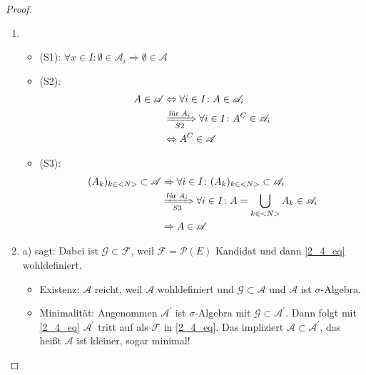 \begin{proof}
	\begin{enumerate}[label=(\alph*)]
		\item 
		\begin{itemize}
			\item (S1): $\forall x \in I\colon \emptyset \in \mathscr{A}_i \Rightarrow \emptyset \in \mathscr{A}$
			\item (S2): 
			\begin{align}
				A \in \mathscr{A} &\Leftrightarrow \forall i \in I \colon A \in \mathscr{A}_i\notag \\
				&\xRightarrow[S2]{\text{für }A_i} \forall i \in I \colon A^C \in \mathscr{A}_i \notag \\
				&\Leftrightarrow A^C \in \mathscr{A} \notag
			\end{align}
			\item (S3): 
			\begin{align}
				(A_k)_{k \in <N>} \subset \mathscr{A} &\Rightarrow \forall i \in I \colon (A_k)_{k \in <N>} \subset \mathscr{A}_i\notag \\
				&\xRightarrow[S3]{\text{für }A_i} \forall i \in I \colon A = \bigcup_{k\in <N>} A_k \in \mathscr{A}_i\notag \\
				&\Rightarrow A \in \mathscr{A}\notag
			\end{align} 
		\end{itemize}
		\item a) sagt:
		Dabei ist $\mathscr{G} \subset \mathscr{F}$, weil $\mathscr{F}=\mathscr{P}(E)$ Kandidat und dann \eqref{2_4_eq} wohldefiniert.
		\begin{itemize}
			\item Existenz: $\mathscr{A}$ reicht, weil $\mathscr{A}$ wohldefiniert und $\mathscr{G} \subset \mathscr{A}$ und $\mathscr{A}$ ist $\sigma$-Algebra.
			\item Minimalität: Angenommen $\mathscr{A}^{'}$ ist $\sigma$-Algebra mit $\mathscr{G} \subset \mathscr{A}^{'}$. Dann folgt mit \eqref{2_4_eq} $\mathscr{A}^{'}$ tritt auf als $\mathscr{F}$ in \eqref{2_4_eq}. Das impliziert $\mathscr{A} \subset \mathscr{A}^{'}$, das heißt $\mathscr{A}$ ist kleiner, sogar minimal!
		\end{itemize}
	\end{enumerate}
\end{proof}

